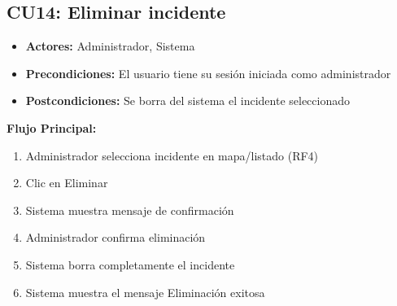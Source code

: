 \begin{multicols}{2}
\subsection*{CU14: Eliminar incidente}
\begin{itemize}
    \item \textbf{Actores:} Administrador, Sistema
    \item \textbf{Precondiciones:} El usuario tiene su sesión iniciada como administrador
    \item \textbf{Postcondiciones:} Se borra del sistema el incidente seleccionado
\end{itemize}
\textbf{Flujo Principal:}
\begin{enumerate}
     \item Administrador selecciona incidente en mapa/listado (RF4)
    \item Clic en Eliminar
    \item Sistema muestra mensaje de confirmación
    \item Administrador confirma eliminación
    \item Sistema borra completamente el incidente
    \item Sistema muestra el mensaje Eliminación exitosa
\end{enumerate}

\end{multicols}